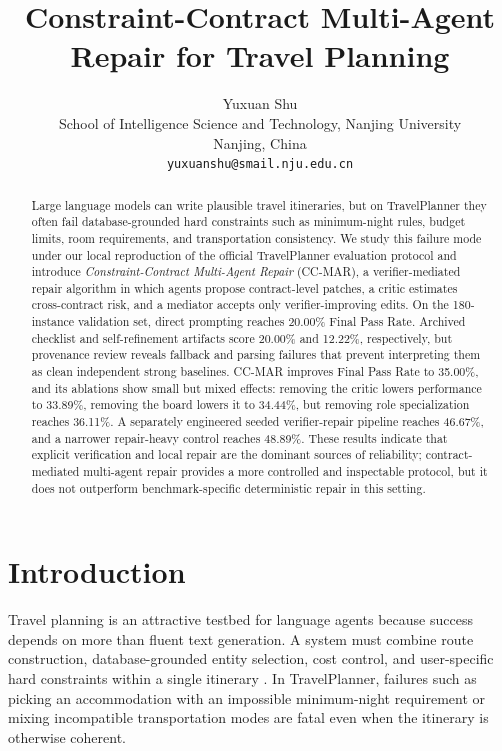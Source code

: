 \documentclass{article}
\title{Constraint-Contract Multi-Agent Repair for Travel Planning}
\author{
  Yuxuan Shu \\
  School of Intelligence Science and Technology, Nanjing University \\
  Nanjing, China \\
  \texttt{yuxuanshu@smail.nju.edu.cn}
}
\begin{document}
\maketitle

\begin{abstract}
Large language models can write plausible travel itineraries, but on TravelPlanner they often fail database-grounded hard constraints such as minimum-night rules, budget limits, room requirements, and transportation consistency. We study this failure mode under our local reproduction of the official TravelPlanner evaluation protocol and introduce \emph{Constraint-Contract Multi-Agent Repair} (CC-MAR), a verifier-mediated repair algorithm in which agents propose contract-level patches, a critic estimates cross-contract risk, and a mediator accepts only verifier-improving edits. On the 180-instance validation set, direct prompting reaches 20.00\% Final Pass Rate. Archived checklist and self-refinement artifacts score 20.00\% and 12.22\%, respectively, but provenance review reveals fallback and parsing failures that prevent interpreting them as clean independent strong baselines. CC-MAR improves Final Pass Rate to 35.00\%, and its ablations show small but mixed effects: removing the critic lowers performance to 33.89\%, removing the board lowers it to 34.44\%, but removing role specialization reaches 36.11\%. A separately engineered seeded verifier-repair pipeline reaches 46.67\%, and a narrower repair-heavy control reaches 48.89\%. These results indicate that explicit verification and local repair are the dominant sources of reliability; contract-mediated multi-agent repair provides a more controlled and inspectable protocol, but it does not outperform benchmark-specific deterministic repair in this setting.
\end{abstract}

\section{Introduction}
Travel planning is an attractive testbed for language agents because success depends on more than fluent text generation. A system must combine route construction, database-grounded entity selection, cost control, and user-specific hard constraints within a single itinerary \citep{xie2024travelplanner}. In TravelPlanner, failures such as picking an accommodation with an impossible minimum-night requirement or mixing incompatible transportation modes are fatal even when the itinerary is otherwise coherent.
\end{document}
